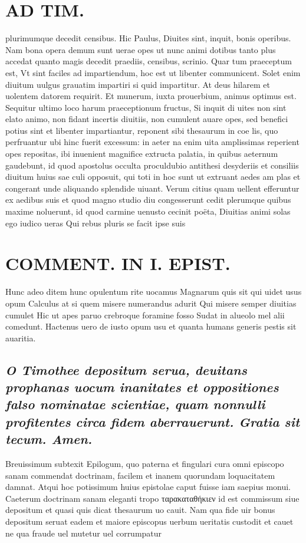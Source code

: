 \documentclass{article}
\begin{document}
\begin{pages}
\section*{AD TIM. }
\marginpar{[ p.173 ]}\pstart plurimumque decedit censibus. Hic Paulus, Diuites sint, inquit, bonis operibus. Nam bona opera demum sunt uerae opes ut nunc animi dotibus tanto plus accedat quanto magis decedit praediis, censibus, scrinio. Quar tum praeceptum est, Vt sint faciles ad impartiendum, hoc est ut libenter communicent. Solet enim diuitum uulgus grauatim impartiri si quid impartitur. At deus hilarem et uolentem datorem requirit. Et munerum, iuxta prouerbium, animus optimus est. Sequitur ultimo loco harum praeceptionum fructus, Si inquit di uites non sint elato animo, non fidant incertis diuitiis, non cumulent auare opes, sed benefici potius sint et libenter impartiantur, reponent sibi thesaurum in coe lis, quo perfruantur ubi hinc fuerit excessum: in aeter na enim uita amplissimas reperient opes repositas, ibi inuenient magnifice extructa palatia, in quibus aeternum gaudebunt, id quod apostolus occulta proculdubio antithesi desyderiis et consiliis diuitum huius sae culi opposuit, qui toti in hoc sunt ut extruant aedes am plas et congerant unde aliquando splendide uiuant. Verum citius quam uellent efferuntur ex aedibus suis et quod magno studio diu congesserunt cedit plerumque  quibus maxime noluerunt, id quod carmine uenusto cecinit poëta,  \pend\pstart Diuitias animi solas ego iudico ueras Qui rebus pluris se facit ipse suis  \pend
\section*{COMMENT. IN I. EPIST. }\pstart Hunc adeo ditem hunc opulentum rite uocamus Magnarum quis sit qui uidet usus opum Calculus at si quem misere numerandus adurit Qui misere semper diuitias cumulet Hic ut apes paruo crebroque foramine fosso Sudat in alueolo mel alii comedunt.  \pend\pstart Hactenus uero de iusto opum usu et quanta humans generis pestis sit auaritia.  \pend
{}
{}
\subsection*{\textit{O Timothee depositum serua, deuitans prophanas uocum inanitates et oppositiones falso nominatae scientiae, quam nonnulli profitentes circa fidem aberrauerunt. Gratia sit tecum. Amen. }}\pstart Breuissimum subtexit Epilogum, quo paterna et fingulari cura omni episcopo sanam commendat doctrinam, facilem et inanem quorundam loquacitatem damnat. Atqui hoc potissimum huius epistolae caput fuisse iam saepius monui. Caeterum doctrinam sanam eleganti tropo ταρακαταθήκιεν id est commissum siue depositum et quasi quis dicat thesaurum uo cauit. Nam qua fide uir bonus depositum seruat eadem et maiore episcopus uerbum ueritatis custodit et cauet ne qua fraude uel mutetur uel corrumpatur  \pend

\end{pages}
\end{document}
